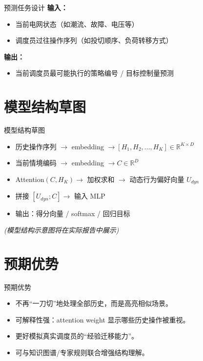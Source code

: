 \documentclass[11pt]{beamer}
\begin{document}
\begin{frame}{预测任务设计}
 \textbf{输入：}
 \begin{itemize}
  \item 当前电网状态（如潮流、故障、电压等）
  \item 调度员过往操作序列（如投切顺序、负荷转移方式）
 \end{itemize}
 \bigskip
 \textbf{输出：}
 \begin{itemize}
  \item 当前调度员最可能执行的策略编号 / 目标控制量预测
 \end{itemize}
\end{frame}

\section{模型结构草图}

\begin{frame}{模型结构草图}
 \centering
 \begin{itemize}
  \item 历史操作序列 $\rightarrow$ embedding $\rightarrow [H_1, H_2, ..., H_K] \in \mathbb{R}^{K \times D}$
  \item 当前情境编码 $\rightarrow$ embedding $\rightarrow C \in \mathbb{R}^{D}$
  \item Attention$(C, H_K) \rightarrow$ 加权求和 $\rightarrow$ 动态行为偏好向量 $U_{dyn}$
  \item 拼接 $[U_{dyn} ; C] \rightarrow$ 输入 MLP
  \item 输出：得分向量 / softmax / 回归目标
 \end{itemize}
 \textit{(模型结构示意图将在实际报告中展示)}
\end{frame}

\section{预期优势}

\begin{frame}{预期优势}
 \begin{itemize}
  \item 不再“一刀切”地处理全部历史，而是高亮相似场景。
  \item 可解释性强：attention weight 显示哪些历史操作被重视。
  \item 更好模拟真实调度员的“经验迁移能力”。
  \item 可与知识图谱/专家规则联合增强结构理解。
 \end{itemize}
\end{frame}
\end{document}
